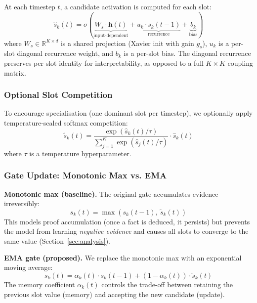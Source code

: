 \documentclass[conference]{IEEEtran}
\newcommand{\Real}{\mathbb{R}}
\begin{document}
At each timestep $t$, a candidate activation is computed for each
slot:
\begin{equation}
    \hat{s}_k(t) = \sigma\!\left(
    \underbrace{W_s \cdot \mathbf{h}(t)}_{\text{input-dependent}}
    + \underbrace{u_k \cdot s_k(t{-}1)}_{\text{recurrence}}
    + \underbrace{b_k}_{\text{bias}}
    \right)
\label{eq:candidate}
\end{equation}
where $W_s \in \Real^{K \times d}$ is a shared projection
(Xavier init with gain $g_s$), $u_k$ is a per-slot diagonal
recurrence weight, and $b_k$ is a per-slot bias. The diagonal
recurrence preserves per-slot identity for interpretability, as
opposed to a full $K \times K$ coupling matrix.

\subsubsection{Optional Slot Competition}

To encourage specialisation (one dominant slot per timestep), we
optionally apply temperature-scaled softmax competition:
\begin{equation}
    \tilde{s}_k(t) = \frac{\exp(\hat{s}_k(t) / \tau)}
    {\sum_{j=1}^K \exp(\hat{s}_j(t) / \tau)} \cdot \hat{s}_k(t)
\label{eq:competition}
\end{equation}
where $\tau$ is a temperature hyperparameter.

\subsubsection{Gate Update: Monotonic Max vs. EMA}

\textbf{Monotonic max (baseline).}
The original gate accumulates evidence irreversibly:
\begin{equation}
    s_k(t) = \max\!\left(s_k(t{-}1),\ \tilde{s}_k(t)\right)
\label{eq:monotonic}
\end{equation}
This models proof accumulation (once a fact is deduced, it
persists) but prevents the model from learning \emph{negative
evidence} and causes all slots to converge to the same value
(Section~\ref{sec:analysis}).

\textbf{EMA gate (proposed).}
We replace the monotonic max with an exponential moving average:
\begin{equation}
    s_k(t) = \alpha_k(t) \cdot s_k(t{-}1) +
    (1 - \alpha_k(t)) \cdot \tilde{s}_k(t)
\label{eq:ema}
\end{equation}
The memory coefficient $\alpha_k(t)$ controls the trade-off
between retaining the previous slot value (memory) and accepting
the new candidate (update).
\end{document}
